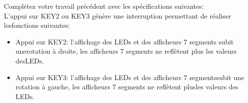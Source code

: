 Complétez votre travail précédent avec les spécifications suivantes:\\
L’appui sur KEY2 ou KEY3 génère une interruption permettant de réaliser lesfonctions suivantes:\\
\begin{itemize}
	\item Appui sur KEY2: l’affichage des LEDs et des afficheurs 7 segments subit unerotation à droite, les afficheurs 7 segments ne reflètent plus les valeurs desLEDs.\\
	\item Appui sur KEY3: l’affichage des LEDs et des afficheurs 7 segmentssubit une rotation à gauche, les afficheurs 7 segments ne reflètent plusles valeurs des LEDs.
\end{itemize}
